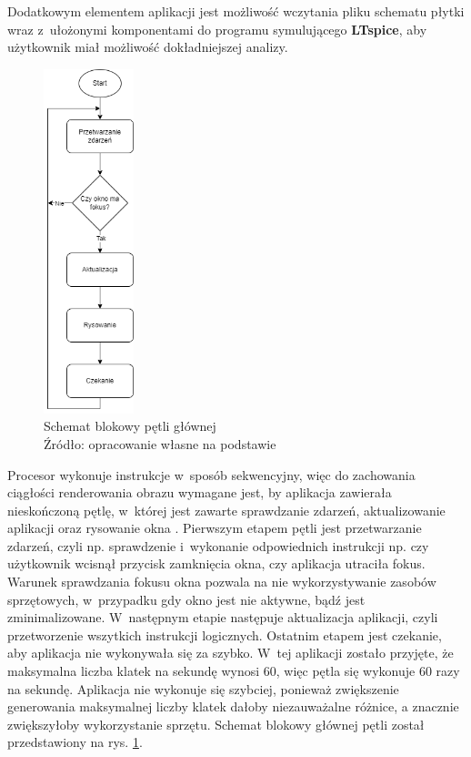 \documentclass[12pt,a4paper]{article} %
\begin{document}
\noindent\aka Dodatkowym elementem aplikacji jest możliwość wczytania pliku schematu płytki wraz z~ułożonymi komponentami do programu symulującego \textbf{LTspice}, aby użytkownik miał możliwość dokładniejszej analizy. 

\begin{figure}[h]
	\centering
	\includegraphics[height=10cm]{images/main_loop.png}
	\caption{Schemat blokowy pętli głównej \\ Źródło: opracowanie własne na podstawie \cite{gameprogrammingpatterns}}
	\label{rys:main_loop}
\end{figure}


\noindent\aka Procesor wykonuje instrukcje w~sposób sekwencyjny, więc do zachowania ciągłości renderowania obrazu wymagane jest, by aplikacja zawierała nieskończoną pętlę, w~której jest zawarte sprawdzanie zdarzeń, aktualizowanie aplikacji oraz rysowanie okna \cite{gameprogrammingpatterns}. Pierwszym etapem pętli jest przetwarzanie zdarzeń, czyli np. sprawdzenie i~wykonanie odpowiednich instrukcji np. czy użytkownik wcisnął przycisk zamknięcia okna, czy aplikacja utraciła fokus. Warunek sprawdzania fokusu okna pozwala na nie wykorzystywanie zasobów sprzętowych, w~przypadku gdy okno jest nie aktywne, bądź jest zminimalizowane. W~następnym etapie następuje aktualizacja aplikacji, czyli przetworzenie wszytkich instrukcji logicznych. Ostatnim etapem jest czekanie, aby aplikacja nie wykonywała się za szybko. W~tej aplikacji zostało przyjęte, że maksymalna liczba klatek na sekundę wynosi 60, więc pętla się wykonuje 60 razy na sekundę. Aplikacja nie wykonuje się szybciej, ponieważ zwiększenie generowania maksymalnej liczby klatek dałoby niezauważalne różnice, a znacznie zwiększyłoby wykorzystanie sprzętu.  Schemat blokowy głównej pętli został przedstawiony na rys. \ref{rys:main_loop}. 
\end{document}
